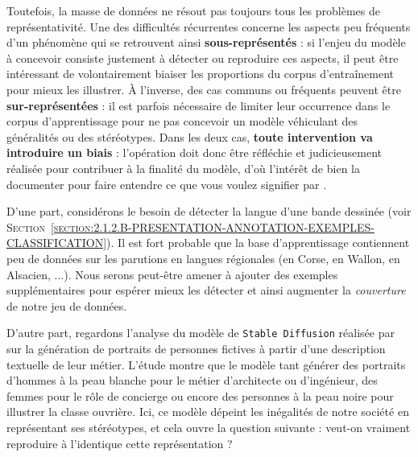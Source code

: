 			Toutefois, la masse de données ne résout pas toujours tous les problèmes de représentativité.
			Une des difficultés récurrentes concerne les aspects peu fréquents d'un phénomène qui se retrouvent ainsi \textbf{sous-représentés} : si l'enjeu du modèle à concevoir consiste justement à détecter ou reproduire ces aspects, il peut être intéressant de volontairement biaiser les proportions du corpus d'entraînement pour mieux les illustrer.
			À l'inverse, des cas communs ou fréquents peuvent être \textbf{sur-représentées} : il est parfois nécessaire de limiter leur occurrence dans le corpus d'apprentissage pour ne pas concevoir un modèle véhiculant des généralités ou des stéréotypes.
			Dans les deux cas, \textbf{toute intervention va introduire un biais} : l'opération doit donc être réfléchie et judicieusement réalisée pour contribuer à la finalité du modèle, d'où l'intérêt de bien la documenter pour faire entendre ce que vous voulez signifier par .
			\begin{leftBarExamples}
				D'une part, considérons le besoin de détecter la langue d'une bande dessinée (voir \textsc{Section~\ref{section:2.1.2.B-PRESENTATION-ANNOTATION-EXEMPLES-CLASSIFICATION}}).
				Il est fort probable que la base d'apprentissage contiennent peu de données sur les parutions en langues régionales (en Corse, en Wallon, en Alsacien, ...).
				Nous serons peut-être amener à ajouter des exemples supplémentaires pour espérer mieux les détecter et ainsi augmenter la \textit{couverture} de notre jeu de données.
				
				D'autre part, regardons l'analyse du modèle de \texttt{Stable Diffusion} réalisée par \cite{nicoletti-bass:2023:generative-ai-takes} sur la génération de portraits de personnes fictives à partir d'une description textuelle de leur métier.
				L'étude montre que le modèle tant générer des portraits d'hommes à la peau blanche pour le métier d'architecte ou d'ingénieur, des femmes pour le rôle de concierge ou encore des personnes à la peau noire pour illustrer la classe ouvrière.
				Ici, ce modèle dépeint les inégalités de notre société en représentant ses stéréotypes, et cela ouvre la question suivante : veut-on vraiment reproduire à l'identique cette représentation ?
			\end{leftBarExamples}

